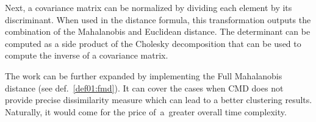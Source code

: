 Next, a covariance matrix can be normalized by dividing each element by its discriminant. When used in the distance formula, this transformation outputs the combination of the Mahalanobis and Euclidean distance. The determinant can be computed as a side product of the Cholesky decomposition that can be used to compute the inverse of a covariance matrix.

The work can be further expanded by implementing the Full Mahalanobis distance (see def.~\ref{def01:fmd}). It can cover the cases when CMD does not provide precise dissimilarity measure which can lead to a better clustering results. Naturally, it would come for the price of~a~greater overall time complexity. 